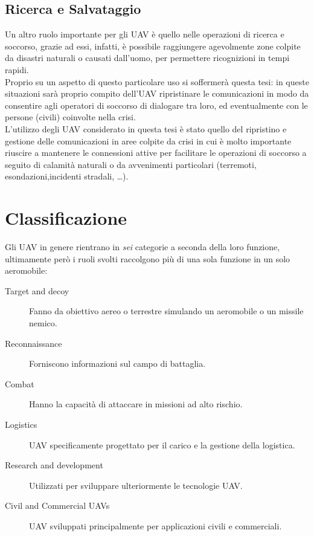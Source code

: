 \subsection*{Ricerca e Salvataggio}
\label{sec:rs}
Un altro ruolo importante per gli \ac{UAV} è quello nelle operazioni di ricerca e soccorso, grazie ad essi, infatti, è possibile
raggiungere agevolmente zone colpite da disastri naturali o causati dall'uomo, per permettere ricognizioni in tempi rapidi. \\
Proprio su un aspetto di questo particolare uso si soffermerà questa tesi: in queste situazioni sarà proprio compito dell'\ac{UAV}
ripristinare le comunicazioni in modo da consentire agli operatori di soccorso di dialogare tra loro, ed eventualmente con 
le persone (civili) coinvolte nella crisi.
\\[1cm]
L'utilizzo degli \ac{UAV} considerato in questa tesi è stato quello del ripristino e gestione delle comunicazioni in aree colpite da crisi 
in cui è molto importante riuscire a mantenere le connessioni attive per facilitare le operazioni di soccorso a seguito di calamità 
naturali o da avvenimenti particolari (terremoti, esondazioni,incidenti stradali, \ldots).

\section{Classificazione}
Gli \ac{UAV}  in genere rientrano in \emph{sei} categorie a seconda della loro funzione, ultimamente però i ruoli svolti raccolgono più
di una sola funzione in un solo aeromobile:

\begin{description}
 \item[Target and decoy] Fanno da obiettivo aereo o terrestre simulando un aeromobile o un missile nemico.
 \item[Reconnaissance] Forniscono informazioni sul campo di battaglia.
 \item[Combat] Hanno la capacità di attaccare in missioni ad alto rischio.
 \item[Logistics] \ac{UAV} specificamente progettato per il carico e la gestione della logistica.
 \item[Research and development] Utilizzati per sviluppare ulteriormente le tecnologie \ac{UAV}.
 \item[Civil and Commercial UAVs] \ac{UAV} sviluppati principalmente per applicazioni civili e commerciali.
\end{description}

